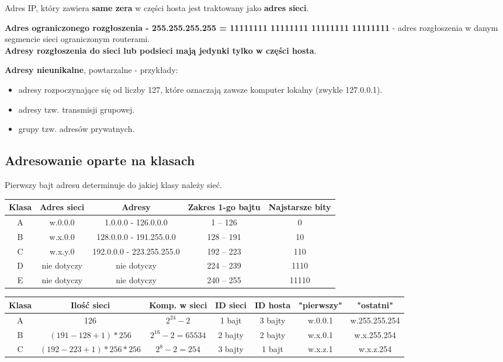 \documentclass[a4paper]{article}
\begin{document}
Adres IP, który zawiera \textbf{same zera} w części hosta jest traktowany jako \textbf{adres sieci}.

\textbf{Adres ograniczonego rozgłoszenia - 255.255.255.255 = 11111111 11111111 11111111 11111111} -  adres rozgłoszenia
w danym segmencie sieci ograniczonym routerami.\\
\textbf{Adresy rozgłoszenia do sieci lub podsieci mają jedynki tylko w części hosta}.

\textbf{Adresy nieunikalne}, powtarzalne - przykłady:
\begin{itemize}
    \item adresy rozpoczynające się od liczby 127, które oznaczają zawsze komputer lokalny (zwykle 127.0.0.1).
    \item adresy tzw. transmisji grupowej.
    \item grupy tzw. adresów prywatnych.
\end{itemize}

\subsection{Adresowanie oparte na klasach}

Pierwszy bajt adresu determinuje do jakiej klasy należy sieć.

\begin{tabular}{|c|c|c|c|c|}
\hline
Klasa & Adres sieci & Adresy & Zakres 1-go bajtu & Najstarsze bity\\
\hline
A & w.0.0.0 & 1.0.0.0 - 126.0.0.0 & 1 – 126 & 0\\
\hline
B & w.x.0.0 & 128.0.0.0 - 191.255.0.0 & 128 – 191 & 10\\
\hline
C & w.x.y.0 & 192.0.0.0 - 223.255.255.0 & 192 – 223 & 110\\
\hline
D & nie dotyczy & nie dotyczy & 224 – 239 & 1110\\
\hline
E & nie dotyczy & nie dotyczy & 240 – 255 & 11110\\
\hline
\end{tabular}


\begin{tabular}{|c|c|c|c|c|c|c|}
\hline
Klasa & Ilość sieci & Komp. w sieci & ID sieci & ID hosta & "pierwszy" & "ostatni"\\
\hline
A & 126 & $2^{24}-2$ & 1 bajt & 3 bajty & w.0.0.1 & w.255.255.254\\
\hline
B & $(191-128+1)*256$ & $2^{16}-2 = 65 534$ & 2 bajty & 2 bajty & w.x.0.1 & w.x.255.254\\
\hline
C & $(192-223+1)*256*256$ & $2^8 -2 = 254$ & 3 bajty & 1 bajt & w.x.z.1 & w.x.z.254\\
\hline
\end{tabular}
\end{document}

